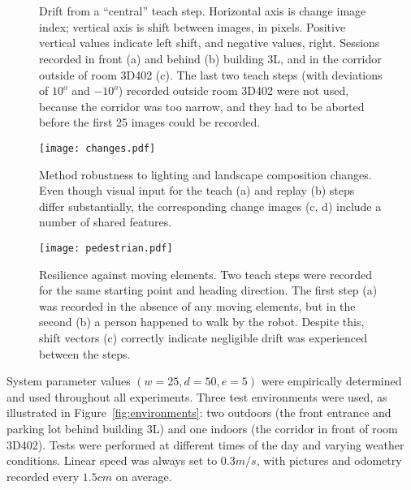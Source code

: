 \documentclass[twocolumn, 9pt,fleqn]{jsproceedings}
\begin{document}
\begin{figure}[h!]
\\
\\
\caption{Drift from a ``central'' teach step. Horizontal axis is change image index; vertical axis is shift between images, in pixels. Positive vertical values indicate left shift, and negative values, right. Sessions recorded in front (a) and behind (b) building 3L, and in the corridor outside of room 3D402 (c). The last two teach steps (with deviations of $10^o$ and $-10^o$) recorded outside room 3D402 were not used, because the corridor was too narrow, and they had to be aborted before the first 25 images could be recorded.}
\label{fig:tests_turn}
\end{figure}

\begin{figure}[h!]
\centering
\texttt{[image: changes.pdf]}
\caption{Method robustness to lighting and landscape composition changes. Even though visual input for the teach (a) and replay (b) steps differ substantially, the corresponding change images (c, d) include a number of shared features.}
\label{fig:changes}
\end{figure}

\begin{figure}[h!]
\texttt{[image: pedestrian.pdf]}
\caption{Resilience against moving elements. Two teach steps were recorded for the same starting point and heading direction. The first step (a) was recorded in the absence of any moving elements, but in the second (b) a person happened to walk by the robot. Despite this, shift vectors (c) correctly indicate negligible drift was experienced between the steps.}
\label{fig:pedestrian}
\end{figure}

System parameter values $(w = 25, d = 50, e = 5)$ were empirically determined and used throughout all experiments. Three test environments were used, as illustrated in Figure~\ref{fig:environments}: two outdoors (the front entrance and parking lot behind building 3L) and one indoors (the corridor in front of room 3D402). Tests were performed at different times of the day and varying weather conditions. Linear speed was always set to $0.3m/s$, with pictures and odometry recorded every $1.5cm$ on average.
\end{document}
